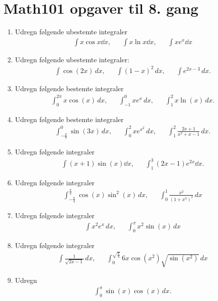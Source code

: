 \newpage
\section{Math101 opgaver til 8. gang}

\begin{enumerate}
	\item \label{it:int21} Udregn følgende ubestemte integraler
	\begin{align*}
	\int x\cos x\dd x,&& \int x\ln x\dd x,&& \int xe^x\dd x
	\end{align*}
	
	\item Udregn følgende ubestemte integraler:
	\begin{align*}
	\int \cos(2x)\, dx,&& \int (1-x)^2\, dx,&& \int e^{2x-3}\, dx.
	\end{align*}
	
	\item Udregn følgende bestemte integraler
	\begin{align*}
	\int_0^{2\pi} x\cos(x)\, dx,&& \int_{-1}^0 xe^x\, dx,&& \int_1^2 x\ln(x)\, dx.
	\end{align*}
	
	\item Udregn følgende bestemte integraler
	\begin{align*}
	\int_{-\frac{\pi}{9}}^0 \sin(3x) \, dx,&& \int_0^2 xe^{x^2}\, dx,&& \int_1^2 \frac{2x+1}{x^2+x-1}\, dx.
	\end{align*}
	
	\item Udregn følgende integraler
	\begin{align*}
	\int (x+1)\sin(x) \dd x,&& \int_1^3 (2x-1) e^{2x} \dd x.
	\end{align*}
	
	\item Udregn følgende integraler
	\begin{align*}
	\int_{-\frac{\pi}{4}}^{\frac{\pi}{4}} \cos(x)\sin^2(x)\, dx ,&& \int_0^1 \frac{x^2}{(1+x^3)^2}\, dx
	\end{align*}
	
	\item Udregn følgende integraler
	\begin{align*}
	\int x^2e^x\, dx,&& \int_0^\pi x^2\sin(x)\, dx
	\end{align*}
	
	\item Udregn følgende integraler
	\begin{align*}
	\int \frac{1}{\sqrt{2x-1}}\, dx,&& \int_0^{\sqrt{\frac{\pi}{6}}} 6x\cos(x^2)\sqrt{\sin(x^2)}\, dx
	\end{align*}
	
	\item Udregn
	\begin{align*}
	\int_0^\pi \sin(x)\cos(x)\, dx.
	\end{align*}
\end{enumerate}